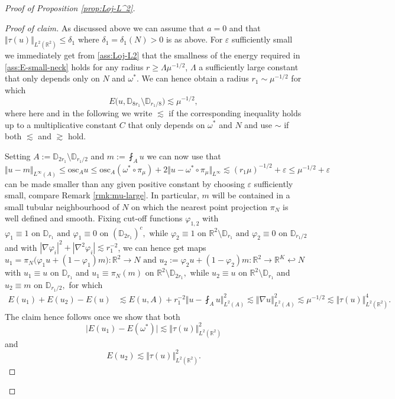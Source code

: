 \documentclass[10pt,reqno]{amsart}
\theoremstyle{plain}
\theoremstyle{definition}
\numberwithin{equation}{section}
\newcommand{\de}{\delta}
\newcommand{\om}{\omega}
\newcommand{\D}{\mathbb{D}}
\newcommand{\La}{\Lambda}
\newcommand{\R}{\ensuremath{{\mathbb R}}}
\newcommand{\osc}{\text{osc}}
\newcommand{\norm}[1]{\Vert#1\Vert}
\newcommand{\beq}{\begin{equation}}
\newcommand{\eeq}{\end{equation}}
\newcommand{\beqs}{\begin{equation*}}
\newcommand{\eeqs}{\end{equation*}}
\newcommand{\beqas}{\begin{equation*}\begin{aligned}}
\newcommand{\eeqas}{\end{aligned}\end{equation*}}
\newcommand{\leqs}{\lesssim}
\newcommand{\geqs}{\gtrsim}
\newcommand{\abs}[1]{\vert#1\vert}
\newcommand{\eps}{\varepsilon}
\newcommand{\na}{\nabla}
\begin{document}
\begin{proof}[Proof of Proposition \ref{prop:Loj-L^2}]
\begin{proof}[Proof of claim]
As discussed above we can assume that $a=0$ and that $\norm{\tau(u)}_{L^2(\R^2)}\leq \de_1$  where $\de_1=\de_1(N)>0$ is as above. For $\eps$ sufficiently small we immediately get from 
\eqref{ass:Loj-L2} that the 
smallness of the energy required in \eqref{ass:E-small-neck} holds for any radius $r\geq \La \mu^{-1/2}$, $\La$ a sufficiently large constant that only depends only on $N$ and $\om^*$. 
We can hence obtain a radius $r_1\sim \mu^{-1/2}$ for which
\beq \label{est:energy-A-larger}
E\bigl(u,\D_{8r_1}\setminus \D_{r_1/8}\bigr)
\leqs
\mu^{-1/2},
\eeq
where here and in the following we write $\leqs$  if the corresponding inequality holds up to a multiplicative constant $C$ that only depends on $\om^*$ and $N$ and use $\sim $ if both $\leqs $ and $\geqs $ hold.  

Setting
$
A:=\D_{2r_1}\setminus \D_{r_1/2}
$ and $ m:=\fint_A u
$ we can now use that 
\beqs
\norm{u-m}_{L^\infty(A)}\leq \osc_A u
\leq
\osc_A(\om^*\circ\pi_\mu)
+
2\norm{u-\om^*\circ\pi_\mu}_{L^\infty}
\leqs
(r_1\mu)^{-1/2}+\eps\leq \mu^{-1/2}+\eps
\eeqs
can be made smaller than any given positive constant by choosing $\eps$ sufficiently small, compare Remark \ref{rmk:mu-large}. In particular, $m$ will be contained in a small tubular neighbourhood of $N$ on which the nearest point projection $\pi_N$ is well defined and smooth.
Fixing cut-off functions 
$\varphi_{1,2}$ with  
\beqs
\varphi_1\equiv1 \text{ on }\D_{r_1}
\text{ and }
\varphi_1\equiv0 \text{ on }(\D_{2r_1})^c,\text{ while } 
\varphi_2\equiv1 \text{ on }\R^2\setminus\D_{r_1}
\text{ and }
\varphi_2\equiv0 \text{ on }\D_{r_1/2}
\eeqs
and with $|\na\varphi_i|^2+|\na^2\varphi_i|
\leqs
r_1^{-2}$, we 
can hence get maps
$$
u_1=\pi_N\bigl(\varphi_1u+(1-\varphi_1)m\bigr) :\R^2\to N \text{ and }
u_2:=\varphi_2u+(1-\varphi_2)m:\R^2\to \R^K\hookleftarrow N
$$
with $
u_1\equiv u$ on $\D_{r_1}$
and  $ u_1\equiv \pi_N(m)$ on $
\R^2\setminus\D_{2r_1},
$ while 
$ u_2\equiv u$ on $ \R^2\setminus\D_{r_1} 
$ 
and $
u_2\equiv m$ on $ \D_{r_1/2},
$ for which 
\beqas
E(u_1)+E(u_2)-E(u)
&\leqs
E(u,A)
+
r_1^{-2} \norm{u-\fint_A u}_{L^2(A)}^2
\leqs
\norm{\na u}_{L^2(A)}^2
\leqs
\mu^{-1/2}
\leqs
\norm{\tau(u)}_{L^2(\R^2)}^4.
\eeqas
The claim hence follows once we show that 
both
\beq
\abs{E(u_1)-E(\om^*)}
\leqs
\norm{\tau(u)}_{L^2(\R^2)}^2
\label{claim:est1}
\eeq
and
\beq
E(u_2)
\leqs
\norm{\tau(u)}_{L^2(\R^2)}^2.
\label{claim:est2}
\eeq


\end{proof}
\end{proof}
\end{document}
